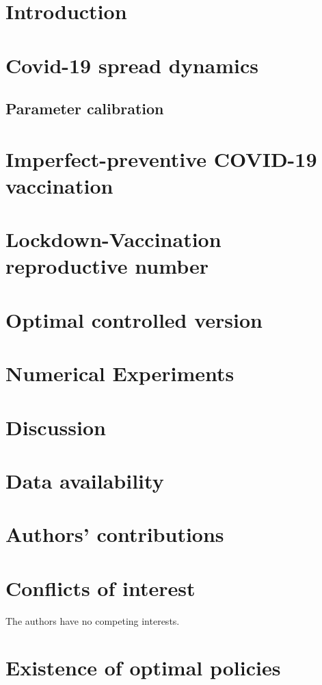 \documentclass[3p, sort&compress]{elsarticle}
\begin{document}
    
    \section{Introduction}
        
    \section{Covid-19 spread dynamics}
        \label{sec:Covid19_spread}
        
        \subsection{Parameter calibration}
            
    \section{Imperfect-preventive COVID-19 vaccination}
        \label{sec:vaccination_model}
        
    \section{Lockdown-Vaccination reproductive number}
        \label{sec:reproductive_number}
        
    \section{Optimal controlled version}
        \label{sec:optimal_controlled}
        
    \section{Numerical Experiments}
        \label{sec:numerical_experiments}
        
        
    \section{Discussion}
        \label{sec:discussion}
        
    \section*{Data availability}
        
    \section*{Authors’ contributions}
    
    \section*{Conflicts of interest}
    The authors have no competing interests.
    
    \appendix
    \section{Existence of optimal policies}
        
        
    
\end{document}
